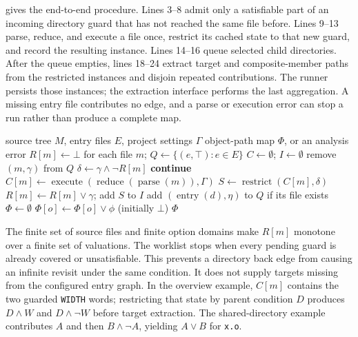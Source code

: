 \documentclass[acmsmall,screen,review]{acmart}
\begin{document}
 gives the end-to-end procedure. Lines 3--8 admit only a satisfiable part of an incoming directory guard that has not reached the same file before. Lines 9--13 parse, reduce, and execute a file once, restrict its cached state to that new guard, and record the resulting instance. Lines 14--16 queue selected child directories. After the queue empties, lines 18--24 extract target and composite-member paths from the restricted instances and disjoin repeated contributions. The runner persists those instances; the extraction interface performs the last aggregation. A missing entry file contributes no edge, and a parse or execution error can stop a run rather than produce a complete map.

\begin{algorithm}[t]
\caption{Extract guarded Kbuild-local object conditions}
\label{alg:extract}
\begin{algorithmic}[1]
\Require source tree $M$, entry files $E$, project settings $\Gamma$
\Ensure object-path map $\Phi$, or an analysis error
\State $R[m]\gets\bot$ for each file $m$; $Q\gets\{(e,\top):e\in E\}$
\State $C\gets\emptyset$; $I\gets\emptyset$
  \State remove $(m,\gamma)$ from $Q$
  \State $\delta\gets\gamma\land\neg R[m]$
    \State \textbf{continue}
  \EndIf
    \State $C[m]\gets\operatorname{execute}(\operatorname{reduce}(\operatorname{parse}(m)),\Gamma)$
  \EndIf
  \State $S\gets\operatorname{restrict}(C[m],\delta)$
  \State $R[m]\gets R[m]\lor\gamma$; add $S$ to $I$
    \State add $(\operatorname{entry}(d),\eta)$ to $Q$ if its file exists
  \EndFor
\EndWhile
\State $\Phi\gets\emptyset$
    \State $\Phi[o]\gets\Phi[o]\lor\phi$ (initially $\bot$)
  \EndFor
\EndFor
\State \Return $\Phi$
\end{algorithmic}
\end{algorithm}

The finite set of source files and finite option domains make $R[m]$ monotone over a finite set of valuations. The worklist stops when every pending guard is already covered or unsatisfiable. This prevents a directory back edge from causing an infinite revisit under the same condition. It does not supply targets missing from the configured entry graph. In the overview example, $C[m]$ contains the two guarded \texttt{WIDTH} words; restricting that state by parent condition $D$ produces $D\land W$ and $D\land\neg W$ before target extraction. The shared-directory example contributes $A$ and then $B\land\neg A$, yielding $A\lor B$ for \texttt{x.o}.
\end{document}

